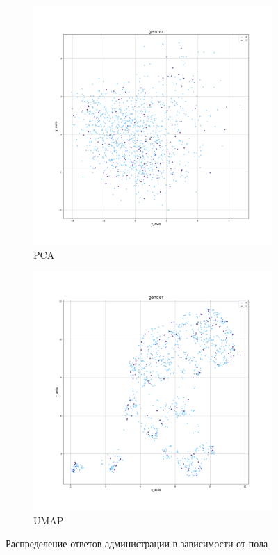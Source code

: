 \begin{figure}[h!]
    \centering
    
    \begin{subfigure}{.5\textwidth}
      \centering
      \includegraphics[width=\linewidth]{../img/administration_PCA_gender.png}
      \caption{PCA}
      \label{img::administration::gender::PCA}
    \end{subfigure}%
    \begin{subfigure}{.5\textwidth}
      \centering
      \includegraphics[width=\linewidth]{../img/administration_UMAP_gender.png}
      \caption{UMAP}
      \label{img::administration::gender::UMAP}
    \end{subfigure}
    \caption{Распределение ответов администрации в зависимости от пола}
\end{figure}

